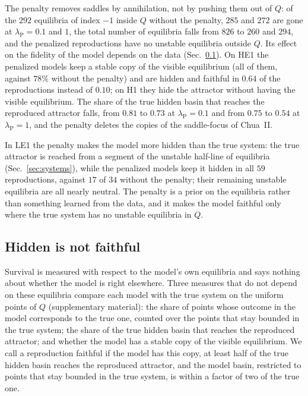 The penalty removes saddles by annihilation, not by pushing them out of $Q$: of the $292$ equilibria of index $-1$ inside
$Q$ without the penalty, $285$ and $272$ are gone at $\lambda_{\mathrm{P}}=0.1$ and $1$, the total number of equilibria falls
from $826$ to $260$ and $294$, and the penalized reproductions have no unstable equilibria outside $Q$. Its effect on the
fidelity of the model depends on the data (Sec.~\ref{sec:fidelity}). On HE1 the penalized models keep a stable copy of the
visible equilibrium (all of them, against $78\%$ without the penalty) and are hidden and faithful in $0.64$ of the
reproductions instead of $0.10$; on H1 they hide the attractor without having the visible equilibrium. The share of the true
hidden basin that reaches the reproduced attractor falls, from $0.81$ to $0.73$ at $\lambda_{\mathrm{P}}=0.1$ and from
$0.75$ to $0.54$ at $\lambda_{\mathrm{P}}=1$, and the penalty deletes the copies of the saddle-focus of Chua~II.

In LE1 the penalty makes the model more hidden than the true system: the true attractor is reached from a segment of the
unstable half-line of equilibria (Sec.~\ref{sec:systems}), while the penalized models keep it hidden in all $59$
reproductions, against $17$ of $34$ without the penalty; their remaining unstable equilibria are all nearly neutral. The
penalty is a prior on the equilibria rather than something learned from the data, and it makes the model faithful only
where the true system has no unstable equilibria in $Q$.

\subsection{Hidden is not faithful}
\label{sec:fidelity}

Survival is measured with respect to the model's own equilibria and says nothing about whether the model is right
elsewhere. Three measures that do not depend on these equilibria compare each model with the true system on the uniform
points of $Q$ (supplementary material): the share of points whose outcome in the model corresponds to the true one,
counted over the points that stay bounded in the true system; the share of the true hidden basin that reaches the
reproduced attractor; and whether the model has a stable copy of the visible equilibrium. We call a reproduction faithful
if the model has this copy, at least half of the true hidden basin reaches the reproduced attractor, and the model basin,
restricted to points that stay bounded in the true system, is within a factor of two of the true one.

